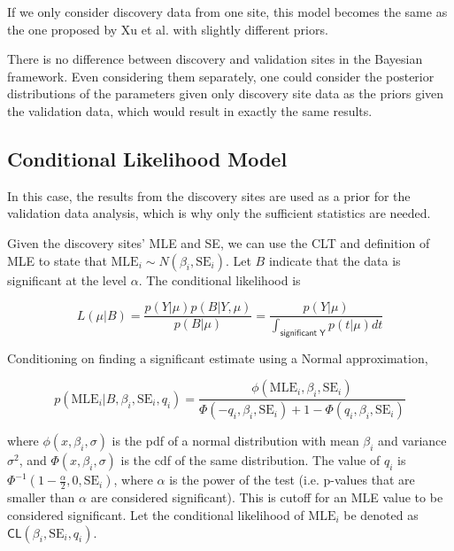 \documentclass[AMA,STIX1COL]{WileyNJD-v2}\usepackage[]{graphicx}\usepackage[]{color}
\begin{document}
If we only consider discovery data from one site, this model becomes the same as the one proposed by Xu et al. with slightly different priors.

There is no difference between discovery and validation sites in the Bayesian framework. Even considering them separately, one could consider the posterior distributions of the parameters given only discovery site data as the priors given the validation data, which would result in exactly the same results. 

\subsection{Conditional Likelihood Model}

In this case, the results from the discovery sites are used as a prior for the validation data analysis, which is why only the sufficient statistics are needed.

Given the discovery sites' MLE and SE, we can use the CLT and definition of MLE to state that $\text{MLE}_i \sim N(\beta_i, \text{SE}_i)$. Let $B$ indicate that the data is significant at the level $\alpha$. The conditional likelihood is

\begin{equation}\label{eq4}
L(\mu | B) = \frac{p(Y| \mu)p(B| Y,\mu)}{p(B|\mu)} =  \frac{p(Y| \mu)}{\int_{\textsf{significant Y}} p(t| \mu) dt }
\end{equation}

Conditioning on finding a significant estimate using a Normal approximation, 

\begin{equation}\label{eq5}
p(\text{MLE}_i | B,\beta_i,\text{SE}_i,q_i) = \frac{\phi(\text{MLE}_i, \beta_i, \text{SE}_i)}{\Phi(-q_i, \beta_i, \text{SE}_i)+1-\Phi(q_i, \beta_i, \text{SE}_i)}
\end{equation}

where $\phi(x, \beta_i, \sigma)$ is the pdf of a normal distribution with mean $\beta_i$ and variance $\sigma^2$, and $\Phi(x, \beta_i, \sigma)$ is the cdf of the same distribution. The value of $q_i$ is $\Phi^{-1}(1-\frac{\alpha}{2}, 0 ,\text{SE}_i)$, where $\alpha$ is the power of the test (i.e. p-values that are smaller than $\alpha$ are considered significant). This is cutoff for an MLE value to be considered significant. Let the conditional likelihood of $\text{MLE}_i$  be denoted as $\textsf{CL}(\beta_i,\text{SE}_i, q_i)$.
\end{document}
